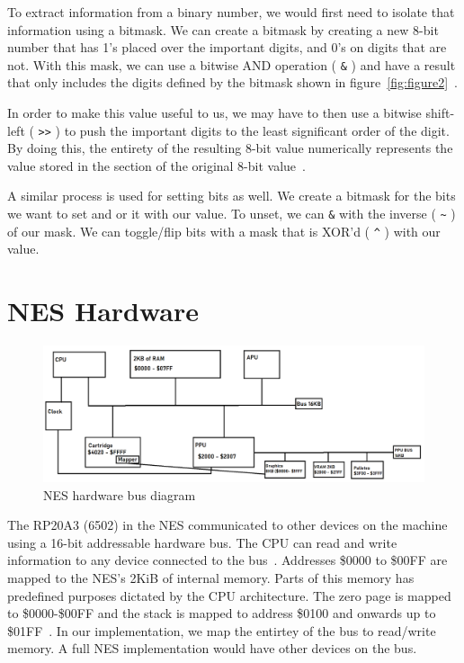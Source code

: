 \documentclass[12pt]{article}
\begin{document}
To extract information from a binary number, we would first need to isolate that information using a bitmask.
We can create a bitmask by creating a new 8-bit number that has
1's placed over the important digits, and 0's on digits that are not. With this mask, we can use a
bitwise AND operation ( \lstinline{&} ) and have a result that only includes the digits defined by the bitmask shown in figure~\ref{fig:figure2}~\cite{bitmasks}.

In order to make this value useful to us, we may have to then use a bitwise shift-left ( \lstinline{>>} ) to push
the important digits to the least significant order of the digit. By doing this, the entirety of the
resulting 8-bit value numerically represents the value stored in the section of the original 8-bit
value~\cite{bitmasks}.

A similar process is used for setting bits as well. We create a bitmask for the bits we want to set
and or it with our value. To unset, we can \lstinline{&} with the inverse ( \lstinline{~} ) of our mask.
We can toggle/flip bits with a mask that is XOR'd ( \lstinline{^} ) with our value.

\section{NES Hardware}
\label{sec:neshardware}

\begin{figure}[h]
	\includegraphics[width=2.0\linewidth,bb=0 0 1049 379]{NES_diagram.PNG}
	\caption{NES hardware bus diagram}
	\label{fig:nes_diag}
\end{figure}

The RP20A3 (6502) in the NES communicated to other devices on the machine using a 16-bit addressable
hardware bus. The CPU can read and write information to any device connected to the bus~\cite{mem_mapping}. 
Addresses \$0000 to \$00FF are mapped to the NES's 2KiB of internal memory. Parts of this memory has
predefined purposes dictated by the CPU architecture. The zero page is mapped to \$0000-\$00FF and the stack
is mapped to address \$0100 and onwards up to \$01FF~\cite{mem_mapping}. In our implementation, we map the entirtey of the
bus to read/write memory. A full NES implementation would have other devices on the bus.
\end{document}
